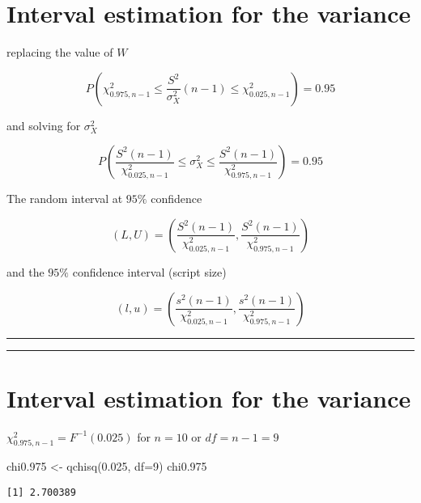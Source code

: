 \documentclass[
]{book}
\newenvironment{Shaded}{\begin{snugshade}}{\end{snugshade}}
\newcommand{\AttributeTok}[1]{\textcolor[rgb]{0.77,0.63,0.00}{#1}}
\newcommand{\DecValTok}[1]{\textcolor[rgb]{0.00,0.00,0.81}{#1}}
\newcommand{\FloatTok}[1]{\textcolor[rgb]{0.00,0.00,0.81}{#1}}
\newcommand{\FunctionTok}[1]{\textcolor[rgb]{0.00,0.00,0.00}{#1}}
\newcommand{\NormalTok}[1]{#1}
\newcommand{\OtherTok}[1]{\textcolor[rgb]{0.56,0.35,0.01}{#1}}
\begin{document}
\hypertarget{interval-estimation-for-the-variance-2}{%
\section{Interval estimation for the variance}\label{interval-estimation-for-the-variance-2}}

replacing the value of \(W\)

\[P(\chi^2_{0.975,n-1} \leq \frac{S^2}{\sigma_X^2}(n-1) \leq \chi^2_{0.025,n-1})=0.95\]

and solving for \(\sigma_X^2\)

\[P(\frac{S^2 (n-1)}{\chi^2_{0.025,n-1}}\leq \sigma_X^2 \leq \frac{S^2(n-1)}{\chi^2_{0.975,n-1}})=0.95\]

The random interval at \(95\%\) confidence

\[(L,U) = (\frac{S^2 (n-1)}{\chi^2_{0.025,n-1}},\frac{S^2(n-1)}{\chi^2_{0.975,n-1}})\]

and the \(95\%\) confidence interval (script size)

\[(l,u) = (\frac{s^2 (n-1)}{\chi^2_{0.025,n-1}},\frac{s^2(n-1)}{\chi^2_{0.975,n-1}})\]

\begin{center}\rule{0.5\linewidth}{0.5pt}\end{center}

\begin{center}\rule{0.5\linewidth}{0.5pt}\end{center}

\hypertarget{interval-estimation-for-the-variance-3}{%
\section{Interval estimation for the variance}\label{interval-estimation-for-the-variance-3}}

\(\chi^2_{0.975,n-1}=F^{-1}(0.025)\)
for \(n=10\) or \(df=n-1=9\)

\begin{Shaded}
\begin{Highlighting}[]
\NormalTok{chi0}\FloatTok{.975} \OtherTok{\textless{}{-}} \FunctionTok{qchisq}\NormalTok{(}\FloatTok{0.025}\NormalTok{, }\AttributeTok{df=}\DecValTok{9}\NormalTok{)}
\NormalTok{chi0}\FloatTok{.975}
\end{Highlighting}
\end{Shaded}

\begin{verbatim}
[1] 2.700389
\end{verbatim}
\end{document}
